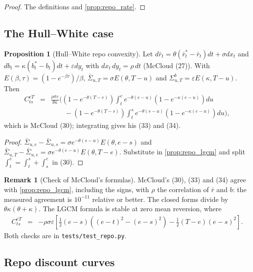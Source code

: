 \documentclass[11pt,english]{amsart}
\theoremstyle{definition}
\newtheorem{prop}{Proposition}
\newtheorem{rema}{Remark}
\begin{document}
\begin{proof}
The definitions and \autoref{prop:repo_rate}.
\end{proof}

\subsection{The Hull--White case}

\begin{prop}[Hull--White repo convexity]\label{prop:repo_hw}
Let $d\bar r_t = \theta(\bar r^*_t - \bar r_t)dt + \sigma dx_t$ and $db_t = \kappa(b^*_t - b_t)dt + \varepsilon dy_t$ with $dx_t\,dy_t = \rho\,dt$ (McCloud (27)). With $E(\beta,\tau) = (1-e^{-\beta\tau})/\beta$, $\bar\Sigma_{u,T} = \sigma E(\theta, T-u)$ and $\Sigma^b_{u,T} = \varepsilon E(\kappa, T-u)$. Then
\begin{eqnarray}
	C^{eT}_{ts} &=& \frac{\rho\sigma\varepsilon}{\theta\kappa}\Big( (1-e^{-\theta(T-e)})\int_t^e e^{-\theta(e-u)}(1-e^{-\kappa(e-u)})du \nonumber\\
	&& \qquad - (1-e^{-\theta(T-s)})\int_t^s e^{-\theta(s-u)}(1-e^{-\kappa(e-u)})du \Big),
\end{eqnarray}
which is McCloud (30); integrating gives his (33) and (34).
\end{prop}

\begin{proof}
$\bar\Sigma_{u,e} - \bar\Sigma_{u,s} = \sigma e^{-\theta(s-u)}E(\theta,e-s)$ and $\bar\Sigma_{u,T} - \bar\Sigma_{u,e} = \sigma e^{-\theta(e-u)}E(\theta,T-e)$. Substitute in \autoref{prop:repo_lgcm} and split $\int_t^e = \int_t^s + \int_s^e$ in (30).
\end{proof}

\begin{rema}[Check of McCloud's formulas]
McCloud's (30), (33) and (34) agree with \autoref{prop:repo_lgcm}, including the signs, with $\rho$ the correlation of $\bar r$ and $b$: the measured agreement is $10^{-11}$ relative or better. The closed forms divide by $\theta\kappa(\theta+\kappa)$. The LGCM formula is stable at zero mean reversion, where
\begin{eqnarray*}
	C^{eT}_{ts} &=& -\rho\sigma\varepsilon\left[\tfrac12(e-s)\left((e-t)^2-(e-s)^2\right) - \tfrac12(T-e)(e-s)^2\right] .
\end{eqnarray*}
Both checks are in \texttt{tests/test\_repo.py}.
\end{rema}

\subsection{Repo discount curves}
\end{document}
